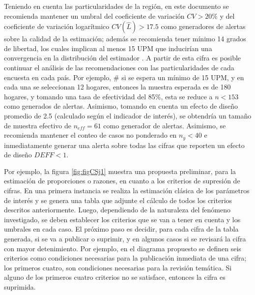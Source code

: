 \documentclass[
  12pt,
]{book}
\begin{document}
Teniendo en cuenta las particularidades de la región, en este documento se recomienda mantener un umbral del coeficiente de variación \(CV > 20\%\) y del coeficiente de variación logarítmico \(CV(\hat{L}) > 17.5%
\) como generadores de alertas sobre la calidad de la estimación; además se recomienda tener mínimo 14 grados de libertad, los cuales implican al menos 15 UPM que inducirían una convergencia en la distribución del estimador \citep[figura 8.1]{Gutierrez_2016}. A partir de esta cifra es posible continuar el análisis de las recomendaciones con las particularidades de cada encuesta en cada país. Por ejemplo, \# si se espera un mínimo de 15 UPM, y en cada una se seleccionan 12 hogares, entonces la muestra esperada es de 180 hogares, y tomando una tasa de efectividad del 85\%, esta se reduce a \(n < 153\) como generados de alertas. Asimismo, tomando en cuenta un efecto de diseño promedio de 2.5 (calculado según el indicador de interés), se obtendría un tamaño de muestra efectivo de \(n_{eff} = 61\) como generador de alertas. Asimismo, se recomienda mantener el conteo de casos no ponderado en \(n_y < 40\) e inmediatamente generar una alerta sobre todas las cifras que reporten un efecto de diseño \(DEFF < 1\).

Por ejemplo, la figura \ref{fig:figCSj1} muestra una propuesta preliminar, para la estimación de proporciones o razones, en cuanto a los criterios de supresión de cifras. En una primera instancia se realiza la estimación clásica de los parámetros de interés y se genera una tabla que adjunte el cálculo de todos los criterios descritos anteriormente. Luego, dependiendo de la naturaleza del fenómeno investigado, se deben establecer los criterios que se van a tener en cuenta y los umbrales en cada caso. El próximo paso es decidir, para cada cifra de la tabla generada, si se va a publicar o suprimir, y en algunos casos si se revisará la cifra con mayor detenimiento. Por ejemplo, en el diagrama propuesto se definen seis criterios como condiciones necesarias para la publicación inmediata de una cifra; los primeros cuatro, son condiciones necesarias para la revisión temática. Si alguno de los primeros cuatro criterios no se satisface, entonces la cifra es suprimida.
\end{document}
